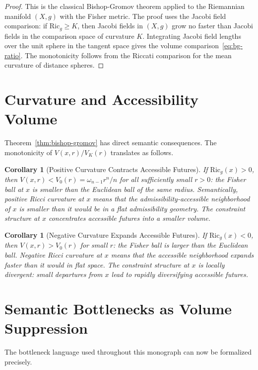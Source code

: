 \documentclass[12pt, oneside]{book}
\theoremstyle{plain-flyxion}
\newtheorem{corollary}[theorem]{Corollary}
\theoremstyle{definition-flyxion}
\begin{document}
\begin{proof}
This is the classical Bishop-Gromov theorem applied to the Riemannian manifold $(X,g)$
with the Fisher metric. The proof uses the Jacobi field comparison: if $\mathrm{Ric}_g
\geq K$, then Jacobi fields in $(X,g)$ grow no faster than Jacobi fields in the
comparison space of curvature $K$. Integrating Jacobi field lengths over the unit sphere
in the tangent space gives the volume comparison~\eqref{eq:bg-ratio}. The monotonicity
follows from the Riccati comparison for the mean curvature of distance spheres.
\end{proof}

\section{Curvature and Accessibility Volume}

Theorem~\ref{thm:bishop-gromov} has direct semantic consequences. The monotonicity of
$V(x,r)/V_K(r)$ translates as follows.

\begin{corollary}[Positive Curvature Contracts Accessible Futures]\label{cor:pos-curv}
If $\mathrm{Ric}_g(x) > 0$, then $V(x,r) < V_0(r) = \omega_{n-1} r^n / n$ for all
sufficiently small $r > 0$: the Fisher ball at $x$ is smaller than the Euclidean ball
of the same radius. Semantically, positive Ricci curvature at $x$ means that the
admissibility-accessible neighborhood of $x$ is smaller than it would be in a flat
admissibility geometry. The constraint structure at $x$ concentrates accessible futures
into a smaller volume.
\end{corollary}

\begin{corollary}[Negative Curvature Expands Accessible Futures]\label{cor:neg-curv}
If $\mathrm{Ric}_g(x) < 0$, then $V(x,r) > V_0(r)$ for small $r$: the Fisher ball is
larger than the Euclidean ball. Negative Ricci curvature at $x$ means that the
accessible neighborhood expands faster than it would in flat space. The constraint
structure at $x$ is locally divergent: small departures from $x$ lead to rapidly
diversifying accessible futures.
\end{corollary}

\section{Semantic Bottlenecks as Volume Suppression}

The bottleneck language used throughout this monograph can now be formalized precisely.
\end{document}
